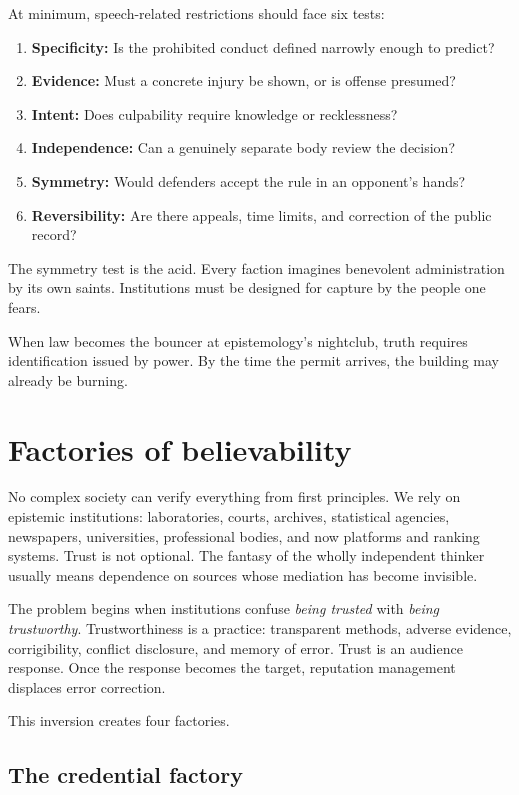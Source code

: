 ﻿\documentclass[12pt,a4paper]{book}
\begin{document}
At minimum, speech-related restrictions should face six tests:

\begin{enumerate}
  \item \textbf{Specificity:} Is the prohibited conduct defined narrowly enough to predict?
  \item \textbf{Evidence:} Must a concrete injury be shown, or is offense presumed?
  \item \textbf{Intent:} Does culpability require knowledge or recklessness?
  \item \textbf{Independence:} Can a genuinely separate body review the decision?
  \item \textbf{Symmetry:} Would defenders accept the rule in an opponent's hands?
  \item \textbf{Reversibility:} Are there appeals, time limits, and correction of the public record?
\end{enumerate}

The symmetry test is the acid. Every faction imagines benevolent administration by its own saints. Institutions must be designed for capture by the people one fears.

When law becomes the bouncer at epistemology's nightclub, truth requires identification issued by power. By the time the permit arrives, the building may already be burning.

\section{Factories of believability}

No complex society can verify everything from first principles. We rely on epistemic institutions: laboratories, courts, archives, statistical agencies, newspapers, universities, professional bodies, and now platforms and ranking systems. Trust is not optional. The fantasy of the wholly independent thinker usually means dependence on sources whose mediation has become invisible.

The problem begins when institutions confuse \emph{being trusted} with \emph{being trustworthy}. Trustworthiness is a practice: transparent methods, adverse evidence, corrigibility, conflict disclosure, and memory of error. Trust is an audience response. Once the response becomes the target, reputation management displaces error correction.

This inversion creates four factories.

\subsection{The credential factory}
\end{document}
